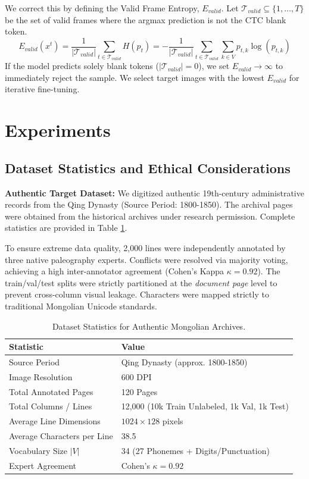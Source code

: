 \documentclass[pdflatex,sn-mathphys-num]{sn-jnl}
\begin{document}
We correct this by defining the Valid Frame Entropy, $E_{valid}$. Let $\mathcal{T}_{valid} \subseteq \{1, \dots, T\}$ be the set of valid frames where the argmax prediction is not the CTC blank token.
\begin{equation}
    E_{valid}(x^t) = \frac{1}{|\mathcal{T}_{valid}|} \sum_{t \in \mathcal{T}_{valid}} H(p_{t}) = -\frac{1}{|\mathcal{T}_{valid}|} \sum_{t \in \mathcal{T}_{valid}} \sum_{k \in V} p_{t,k} \log(p_{t,k})
\end{equation}
If the model predicts solely blank tokens ($|\mathcal{T}_{valid}|=0$), we set $E_{valid} \rightarrow \infty$ to immediately reject the sample. We select target images with the lowest $E_{valid}$ for iterative fine-tuning.

\section{Experiments}

\subsection{Dataset Statistics and Ethical Considerations}
\textbf{Authentic Target Dataset:} We digitized authentic 19th-century administrative records from the Qing Dynasty (Source Period: 1800-1850). The archival pages were obtained from the historical archives under research permission. Complete statistics are provided in Table \ref{tab:dataset}.

To ensure extreme data quality, 2,000 lines were independently annotated by three native paleography experts. Conflicts were resolved via majority voting, achieving a high inter-annotator agreement (Cohen's Kappa $\kappa = 0.92$). The train/val/test splits were strictly partitioned at the \textit{document page} level to prevent cross-column visual leakage. Characters were mapped strictly to traditional Mongolian Unicode standards.

\begin{table}[htbp]
\centering
\caption{Dataset Statistics for Authentic Mongolian Archives.}
\label{tab:dataset}
\begin{tabular}{l l}
\toprule
\textbf{Statistic} & \textbf{Value} \\
\midrule
Source Period & Qing Dynasty (approx. 1800-1850) \\
Image Resolution & 600 DPI \\
Total Annotated Pages & 120 Pages \\
Total Columns / Lines & 12,000 (10k Train Unlabeled, 1k Val, 1k Test) \\
Average Line Dimensions & $1024 \times 128$ pixels \\
Average Characters per Line & 38.5 \\
Vocabulary Size $|V|$ & 34 (27 Phonemes + Digits/Punctuation) \\
Expert Agreement & Cohen's $\kappa = 0.92$ \\
\bottomrule
\end{tabular}
\end{table}
\end{document}
